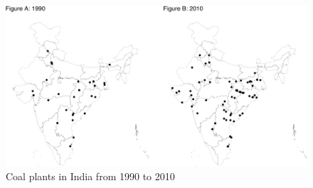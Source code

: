 \documentclass[
]{article}
\begin{document}
\FloatBarrier
\newpage

\begin{figure}
\includegraphics{draft_files/figure-latex/plants-1} \caption[Coal plants in India from 1990 to 2010]{Coal plants in India from 1990 to 2010}\label{fig:plants}
\end{figure}

\FloatBarrier
\newpage
\end{document}
